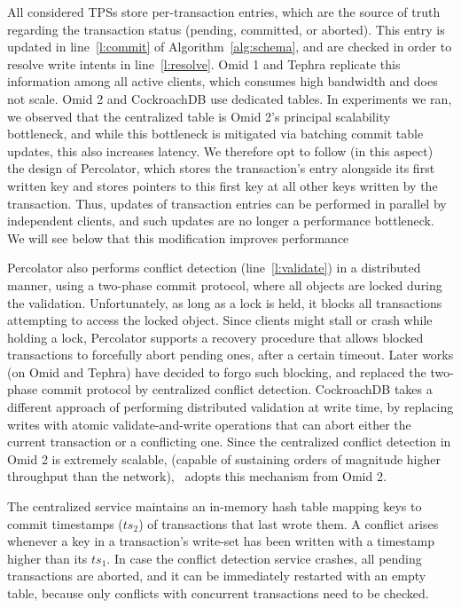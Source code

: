 All considered TPSs store per-transaction entries, which are the source of truth regarding the transaction status (pending, committed, or aborted). 
This entry is updated in line~\ref{l:commit} of Algorithm~\ref{alg:schema}, and are checked in order to resolve write intents in line~\ref{l:resolve}.
Omid 1 and Tephra replicate this information among all active clients, which consumes high bandwidth and does not scale. Omid 2 and 
CockroachDB use dedicated tables. In experiments we ran, we observed that the centralized table is Omid 2's principal scalability bottleneck, and while this bottleneck is mitigated via batching commit table updates, this also increases latency. 
We therefore opt to follow (in this aspect) the design of Percolator, which stores the transaction's entry alongside its first written key and stores pointers to this first key at all other keys written by the transaction. Thus, updates of transaction entries can be performed in parallel by 
independent clients, and such updates are no longer a performance bottleneck. 
We will see below that this modification improves performance 

Percolator also performs conflict detection (line~\ref{l:validate}) in a distributed manner, using a two-phase commit protocol, where all objects are locked during the validation.  Unfortunately, as long as a lock is held, it blocks all transactions attempting to access the locked object. Since clients might stall or 
crash while holding a lock, Percolator supports a recovery procedure that allows blocked transactions to forcefully abort pending ones, 
after a certain timeout. Later works (on Omid and Tephra) have decided to forgo such blocking, and replaced the two-phase commit protocol by 
centralized conflict detection. CockroachDB takes a different approach of performing distributed validation at write time, by replacing writes with atomic validate-and-write operations that can abort either the current transaction or a conflicting one. Since the centralized conflict detection in Omid 2 is extremely scalable, (capable of sustaining orders of magnitude higher throughput than the network), 
\sys\ adopts this mechanism from Omid 2. 

The centralized service maintains an in-memory hash table mapping keys to 
commit timestamps ($ts_2$) of transactions that last wrote them. A conflict arises whenever a key in a transaction's write-set has been written 
with a timestamp higher than its $ts_1$. 
In case the conflict detection service crashes, all pending transactions are aborted, and it can be immediately restarted with an empty table, because only conflicts with concurrent transactions need to be checked. 

